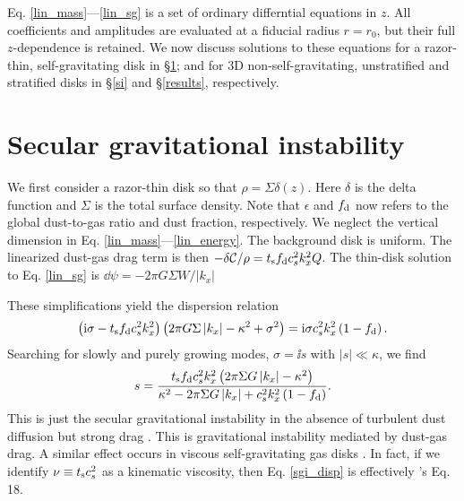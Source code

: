 
Eq. \ref{lin_mass}---\ref{lin_sg} is a set of ordinary
differntial equations in $z$. All coefficients and amplitudes are
evaluated at a fiducial radius $r=r_0$, but their full $z$-dependence
is retained. We now discuss solutions to these equations for a
razor-thin, self-gravitating disk in \S\ref{sgi}; and for 3D
non-self-gravitating, unstratified and stratified disks 
in \S\ref{si} and \S\ref{results}, respectively.   
 


\section{Secular gravitational instability}\label{sgi}
We first consider a razor-thin disk so that $\rho =
\Sigma\delta(z)$. Here $\delta$ is the delta function and $\Sigma$ is
the total surface density. Note that $\epsilon$ and 
$f_\mathrm{d}$ now refers to the global dust-to-gas ratio and dust 
fraction, respectively. We neglect the vertical dimension   
in Eq. \ref{lin_mass}---\ref{lin_energy}. The background disk is
uniform. The linearized dust-gas drag term is then
$-\delta\mathcal{C}/\rho = t_\mathrm{s}f_\mathrm{d} c_s^2k_x^2 Q$. The
thin-disk solution to Eq. \ref{lin_sg} is $\dd\psi = -2\pi G
\Sigma W/\left|k_x\right|$    

These simplifications yield the dispersion relation
\begin{align*}
  \left(\mathrm{i}\sigma - t_\mathrm{s}f_\mathrm{d} c_s^2k_x^2\right)\left( 2 \pi G
    \Sigma \left|k_x\right|  - \kappa^2 + \sigma^2 \right) = \mathrm{i}
  \sigma c_s^2 k_x^2\left(1 - f_\mathrm{d}\right). 
\end{align*}
Searching for slowly and purely growing modes, $\sigma = \ii s$ with 
$|s|\ll \kappa$, we find 
\begin{align}  
s = \frac{t_\mathrm{s}f_\mathrm{d} c_s^2 k_x^2 \left( 2 \pi \Sigma G
    \left|k_x\right| - \kappa^2\right)}{\kappa^2 -2 \pi \Sigma G
    \left|k_x\right| + c_s^2k_x^2\left(1-f_\mathrm{d}\right) }. \label{sgi_disp}
\end{align}
This is just the secular gravitational instability in the absence of
turbulent dust diffusion but strong drag
\citep[][ their Eq. 13 becomes Eq. \ref{sgi_disp} in this limit with
a change of variables]{takahashi14}. This is gravitational instability
mediated by dust-gas drag. A similar effect occurs in viscous
self-gravitating gas disks \citep{gammie96,lin16}. In fact, if we
identify $\nu \equiv t_\mathrm{s} c_s^2$ as a kinematic viscosity, then
Eq. \ref{sgi_disp} is effectively 
\citeauthor{gammie96}'s Eq. 18. 

